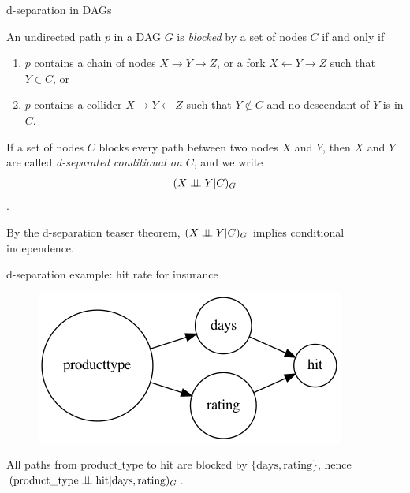 \begin{frame}{d-separation in DAGs}
  \begin{definition}
    An undirected path $p$ in a DAG $G$ is \emph{blocked} by a set of nodes $C$ if and only if
    \begin{enumerate}
      \item $p$ contains a chain of nodes $X \to Y \to Z$, or a fork $X \leftarrow Y \rightarrow Z$ such that $Y \in C$, or
      \item $p$ contains a collider $X \to Y \leftarrow Z$ such that $Y \notin C$ and no descendant of $Y$ is in $C$.
    \end{enumerate}
  \end{definition}

  \begin{definition}
    If a set of nodes $C$ blocks every path between two nodes $X$ and $Y$, then $X$ and $Y$ are called \emph{d-separated conditional on $C$}, and we write
    $$(X \perp\!\!\!\perp Y | C)_{G}$$.
  \end{definition}

  By the d-separation teaser theorem, $(X \perp\!\!\!\perp Y | C)_{G}$ implies conditional independence.\newline
\end{frame}


\begin{frame}{d-separation example: hit rate for insurance}
  \begin{figure}[ht]
    \centering
    \includegraphics[height=0.5\textheight]{graphics/hits}
  \end{figure}

  All paths from $\mathrm{product\_type}$ to $\mathrm{hit}$ are blocked by $\{\mathrm{days}, \mathrm{rating}\}$, hence $(\mathrm{product\_type} \perp\!\!\!\perp \mathrm{hit} | \mathrm{days}, \mathrm{rating})_G$.
\end{frame}


